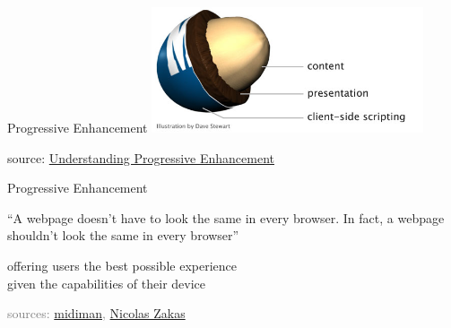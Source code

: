 \documentclass{beamer}
\begin{document}
\begin{frame}{Progressive Enhancement}
  \vspace*{1cm}
  \center \includegraphics[width=8cm]{images/peanut.jpg}

  \vspace*{1cm}
  \tiny source: \href{http://www.alistapart.com/articles/understandingprogressiveenhancement/}{Understanding Progressive Enhancement}
\end{frame}

\begin{frame}{Progressive Enhancement}

  \begin{exampleblock}{}
    {\large ``A webpage doesn't have to look the same in every browser. In fact, a webpage shouldn't look the same in every browser''}
    \vskip5mm
    \hspace*{}
  \end{exampleblock}

  \vspace*{0.5cm}
  offering users the best possible experience \\
  given the capabilities of their device
\end{frame}

{
  \begin{frame}
    \vspace*{6.7cm}
    \textcolor{gray}{\tiny
        sources:
        \href{http://www.flickr.com/photos/midiman/336647596}{midiman},
        \href{http://www.slideshare.net/nzakas/progressive-enhancement-20-conference-agnostic}{Nicolas Zakas}
    }
  \end{frame}
}
\end{document}
